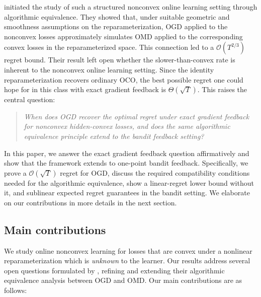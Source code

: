 \documentclass[a4paper,11pt,fullpage]{article}
\theoremstyle{plain}
\theoremstyle{definition}
\theoremstyle{plain}
\begin{document}
\citet{ghai-lu-hazan22} initiated the study of such a structured nonconvex online learning setting through algorithmic equivalence. They showed that, under suitable geometric and smoothness assumptions on the reparameterization, OGD applied to the nonconvex losses approximately simulates OMD applied to the corresponding convex losses in the reparameterized space. 
This connection led to a $\mathcal{O}(T^{2/3})$ regret bound. Their result left open whether the slower-than-convex rate is inherent to the nonconvex online learning setting. Since the identity reparameterization recovers ordinary OCO, the best possible regret one could hope for in this class with exact gradient feedback is $\Theta(\sqrt{T})$. 
This raises the central question: 
\begin{quote}
\center
\textit{
When does OGD recover the optimal regret under exact gradient feedback for nonconvex hidden-convex losses, and does the same algorithmic equivalence principle extend to the bandit feedback setting?
}
\end{quote}
\medskip 
In this paper, we answer the exact gradient feedback question affirmatively and show that the framework extends to one-point bandit feedback. 
Specifically, we prove a $\mathcal{O}(\sqrt{T})$ regret for OGD, discuss the required compatibility conditions needed for the algorithmic equivalence, show a linear-regret lower bound without it, and sublinear expected regret guarantees in the bandit setting. We elaborate on our contributions in more details in the next section. 

\subsection{Main contributions}

We study online nonconvex learning for losses that are convex under a nonlinear reparameterization which is \textit{unknown} to the learner.  
Our results address several open questions formulated by  \citet{ghai-lu-hazan22}, refining and extending their algorithmic equivalence analysis between OGD and OMD. Our main contributions are as follows:
\end{document}
